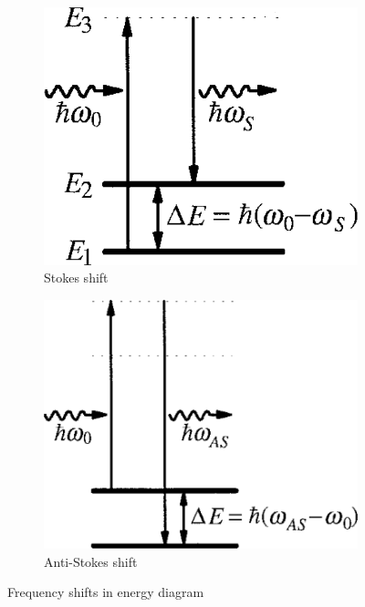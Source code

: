 \documentclass{standalone}
\begin{document}
\begin{figure}[h]
	\centering
	\begin{subfigure}[b]{0.4\textwidth}
		\includegraphics[width=\textwidth]{freq_shift_stokes.png}
		\caption{Stokes shift}
	\end{subfigure}
	\begin{subfigure}[b]{0.4\textwidth}
		\includegraphics[width=\textwidth]{freq_shift_antistokes.png}
		\caption{Anti-Stokes shift}
	\end{subfigure}
	\caption{Frequency shifts in energy diagram \cite{Farahani1999}}
	\label{fig:freq_shift}
\end{figure}
\end{document}
